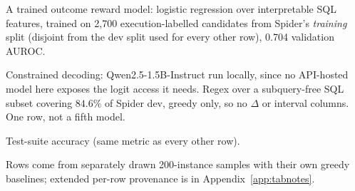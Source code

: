 \documentclass[11pt]{article}
\begin{document}
\begin{table}[!htbp]
\begin{threeparttable}
\begin{minipage}{\columnwidth}
\begin{tablenotes}[flushleft]
\item[l] A trained outcome reward model: logistic regression over
interpretable SQL features, trained on 2{,}700 execution-labelled
candidates from Spider's \emph{training} split (disjoint from the dev
split used for every other row), 0.704 validation AUROC.
\item[n] Constrained decoding: Qwen2.5-1.5B-Instruct run locally, since no
API-hosted model here exposes the logit access it needs. Regex over a
subquery-free SQL subset covering $84.6\%$ of Spider dev, greedy only, so
no $\Delta$ or interval columns. One row, not a fifth model.
\item[o] Test-suite accuracy (same metric as every other row).
\item[] Rows come from separately drawn 200-instance samples with their own
greedy baselines; extended per-row provenance is in
Appendix~\ref{app:tabnotes}.
\end{tablenotes}\end{minipage}
\end{threeparttable}
\caption*{\textbf{SQL, GPT-4o} (Spider dev split; sound stack $=$ \texttt{parses}\,$\wedge$\allowbreak\,\texttt{schema\_valid}\,$\wedge$\allowbreak\,\texttt{executes}).}


\label{tab:main}
\end{table}
\end{document}
